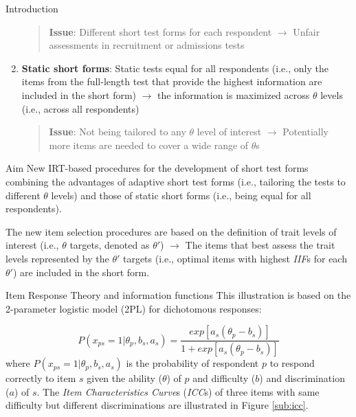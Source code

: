 \documentclass[final,t]{beamer}
\begin{document}
\begin{frame}
\begin{columns}[t]
\begin{column}{.45\linewidth}
\begin{block}{\centering Introduction}
\begin{enumerate}
		\begin{quote}
			\textbf{Issue}: Different short test forms for each respondent $\rightarrow$ Unfair assessments in recruitment or admissions tests
		\end{quote}
		
		\item  \textbf{Static short forms}: Static tests equal for all respondents (i.e., only the items from the full-length test that provide the highest information are included in the short form) $\rightarrow$ the information is maximized across $\theta$ levels (i.e., across all respondents)
		
		\begin{quote}
			\textbf{Issue}: Not being tailored to any $\theta$ level of interest $\rightarrow$ Potentially more items are needed to  cover a wide range of $\theta$s
		\end{quote}
	\end{enumerate}
\end{block}    

\begin{block}{\centering Aim}
	New IRT-based procedures for the development of short test forms combining the advantages of adaptive short test forms (i.e., tailoring the tests to different $\theta$ levels) and  those of static short forms (i.e., being equal for all respondents). 
	
	The new item selection procedures are based on the definition of trait levels of interest (i.e., $\theta$ targets, denoted as $\theta'$) $\rightarrow$  The items that best assess the trait levels represented by the $\theta'$ targets (i.e., optimal items with highest \emph{IIF}s for each $\theta'$) are included in the short form.

\end{block}

\begin{block}{\centering Item Response Theory and information functions}
	This illustration is based on the 2-parameter logistic model (2PL) for dichotomous responses: 
	
	\begin{equation}\label{eq:2pl}
		P(x_{ps} = 1|\theta_p, b_s, a_s) = \frac{exp[a_s(\theta_p - b_s)]}{1 + exp[a_s(\theta_p - b_s)]}
	\end{equation}
	where $P(x_{ps} = 1|\theta_p, b_s, a_s)$ is the probability of respondent $p$ to respond correctly to item $s$ given the ability ($\theta$) of $p$ and  difficulty ($b$) and discrimination ($a$) of $s$. 
	The \emph{Item Characteristics Curve}s (\emph{ICC}s) of three items with same difficulty but different discriminations are illustrated in Figure \ref{sub:icc}.
	

\end{block}
\end{column}
\end{columns}
\end{frame}
\end{document}
